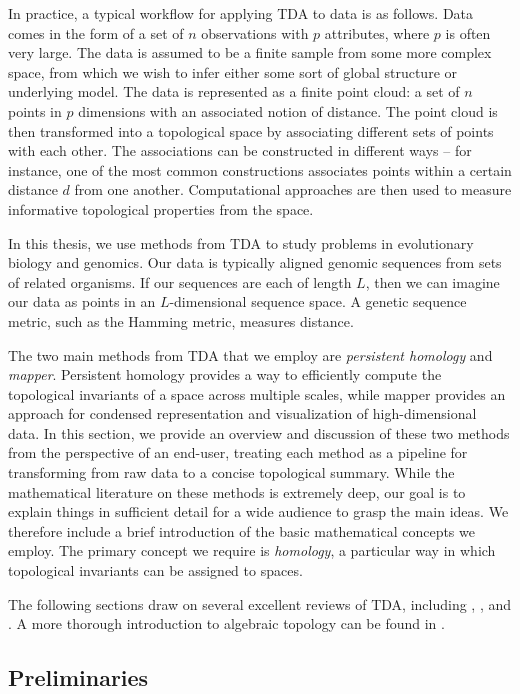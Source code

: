 In practice, a typical workflow for applying TDA to data is as follows.
Data comes in the form of a set of $n$ observations with $p$ attributes, where $p$ is often very large.
The data is assumed to be a finite sample from some more complex space, from which we wish to infer either some sort of global structure or underlying model.
The data is represented as a finite point cloud: a set of $n$ points in $p$ dimensions with an associated notion of distance.
The point cloud is then transformed into a topological space by associating different sets of points with each other.
The associations can be constructed in different ways -- for instance, one of the most common constructions associates points within a certain distance $d$ from one another.
Computational approaches are then used to measure informative topological properties from the space.

In this thesis, we use methods from TDA to study problems in evolutionary biology and genomics.
Our data is typically aligned genomic sequences from sets of related organisms.
If our sequences are each of length $L$, then we can imagine our data as points in an $L$-dimensional sequence space.
A genetic sequence metric, such as the Hamming metric, measures distance.

The two main methods from TDA that we employ are \emph{persistent homology} and \emph{mapper}.
Persistent homology provides a way to efficiently compute the topological invariants of a space across multiple scales, while mapper provides an approach for condensed representation and visualization of high-dimensional data.
In this section, we provide an overview and discussion of these two methods from the perspective of an end-user, treating each method as a pipeline for transforming from raw data to a concise topological summary.
While the mathematical literature on these methods is extremely deep, our goal is to explain things in sufficient detail for a wide audience to grasp the main ideas.
We therefore include a brief introduction of the basic mathematical concepts we employ.
The primary concept we require is \emph{homology}, a particular way in which topological invariants can be assigned to spaces.

The following sections draw on several excellent reviews of TDA, including \cite{Carlsson:2009a}, \cite{Edelsbrunner:2010}, and \cite{Ghrist:2008}.
A more thorough introduction to algebraic topology can be found in \cite{Hatcher:2002ut}.

\subsection{Preliminaries}
\label{bg:tda:math}

